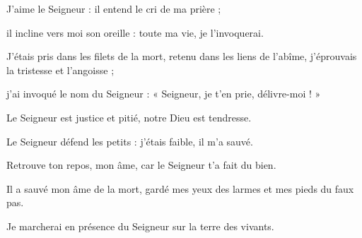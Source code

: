 \item J'aime le Seigneur : il entend le cri de ma prière ;

\item il incline vers moi son oreille : toute ma vie, je l'invoquerai.

\item J'étais pris dans les filets de la mort, retenu dans les liens de l'abîme, j'éprouvais la tristesse et l'angoisse ;

\item j'ai invoqué le nom du Seigneur : « Seigneur, je t'en prie, délivre-moi ! »

\item Le Seigneur est justice et pitié, notre Dieu est tendresse.

\item Le Seigneur défend les petits : j'étais faible, il m'a sauvé.

\item Retrouve ton repos, mon âme, car le Seigneur t'a fait du bien.

\item Il a sauvé mon âme de la mort, gardé mes yeux des larmes et mes pieds du faux pas.

\item Je marcherai en présence du Seigneur sur la terre des vivants.

